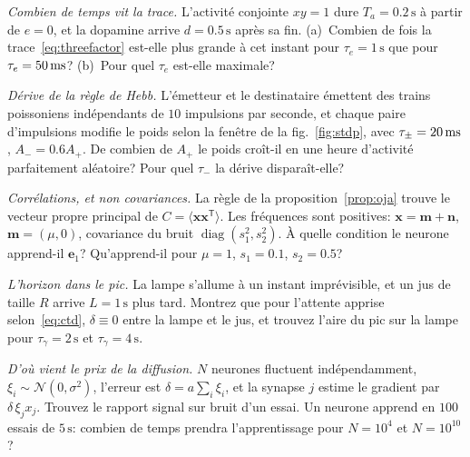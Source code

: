 \begin{exercise}[\lvlA]
\label{ex:06:1}
\emph{Combien de temps vit la trace.} L'activité conjointe $xy=1$ dure $T_a=0.2\,\text{s}$ à partir de $e=0$, et la dopamine arrive $d=0.5\,\text{s}$ après sa fin. (a)~Combien de fois la trace~\eqref{eq:threefactor} est-elle plus grande à cet instant pour $\tau_e=1\,\text{s}$ que pour $\tau_e=50\,\text{ms}$? (b)~Pour quel $\tau_e$ est-elle maximale?
\end{exercise}

\begin{exercise}[\lvlA]
\label{ex:06:2}
\emph{Dérive de la règle de Hebb.} L'émetteur et le destinataire émettent des trains poissoniens indépendants de $10$ impulsions par seconde, et chaque paire d'impulsions modifie le poids selon la fenêtre de la fig.~\ref{fig:stdp}, avec $\tau_\pm=20\,\text{ms}$, $A_-=0.6A_+$. De combien de $A_+$ le poids croît-il en une heure d'activité parfaitement aléatoire? Pour quel $\tau_-$ la dérive disparaît-elle?
\end{exercise}

\begin{exercise}[\lvlB]
\label{ex:06:3}
\emph{Corrélations, et non covariances.} La règle de la proposition~\ref{prop:oja} trouve le vecteur propre principal de $C=\langle\mathbf x\mathbf x^{\mathsf T}\rangle$. Les fréquences sont positives: $\mathbf x=\mathbf m+\mathbf n$, $\mathbf m=(\mu,0)$, covariance du bruit $\operatorname{diag}(s_1^2,s_2^2)$. À quelle condition le neurone apprend-il $\mathbf e_1$? Qu'apprend-il pour $\mu=1$, $s_1=0.1$, $s_2=0.5$?
\end{exercise}

\begin{exercise}[\lvlA]
\label{ex:06:4}
\emph{L'horizon dans le pic.} La lampe s'allume à un instant imprévisible, et un jus de taille $R$ arrive $L=1\,\text{s}$ plus tard. Montrez que pour l'attente apprise selon~\eqref{eq:ctd}, $\delta\equiv0$ entre la lampe et le jus, et trouvez l'aire du pic sur la lampe pour $\tau_\gamma=2\,\text{s}$ et $\tau_\gamma=4\,\text{s}$.
\end{exercise}

\begin{exercise}[\lvlB]
\label{ex:06:5}
\emph{D'où vient le prix de la diffusion.} $N$ neurones fluctuent indépendamment, $\xi_i\sim\mathcal N(0,\sigma^2)$, l'erreur est $\delta=a\sum_i\xi_i$, et la synapse $j$ estime le gradient par $\delta\,\xi_jx_j$. Trouvez le rapport signal sur bruit d'un essai. Un neurone apprend en $100$ essais de $5\,\text{s}$: combien de temps prendra l'apprentissage pour $N=10^4$ et $N=10^{10}$?
\end{exercise}

